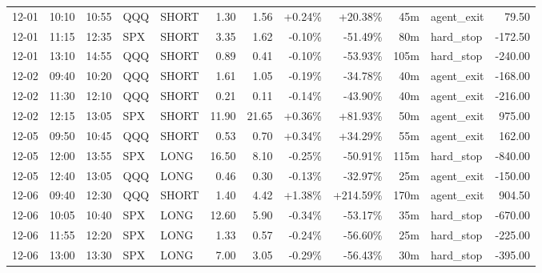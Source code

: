 \documentclass[11pt,a4paper,twoside]{article}
\begin{document}
\begin{center}
\begin{longtable}{>{\color{txtmain}}l l l l l r r r r r >{\color{txtmain}}l r}
12-01 & 10:10 & 10:55 & QQQ & SHORT & 1.30 & 1.56 & \textcolor{wingreen}{+0.24\%} & \textcolor{wingreen}{+20.38\%} & 45m & agent\_exit & \textcolor{wingreen}{79.50} \\
12-01 & 11:15 & 12:35 & SPX & SHORT & 3.35 & 1.62 & \textcolor{lossred}{-0.10\%} & \textcolor{lossred}{-51.49\%} & 80m & hard\_stop & \textcolor{lossred}{-172.50} \\
12-01 & 13:10 & 14:55 & QQQ & SHORT & 0.89 & 0.41 & \textcolor{lossred}{-0.10\%} & \textcolor{lossred}{-53.93\%} & 105m & hard\_stop & \textcolor{lossred}{-240.00} \\
12-02 & 09:40 & 10:20 & QQQ & SHORT & 1.61 & 1.05 & \textcolor{lossred}{-0.19\%} & \textcolor{lossred}{-34.78\%} & 40m & agent\_exit & \textcolor{lossred}{-168.00} \\
12-02 & 11:30 & 12:10 & QQQ & SHORT & 0.21 & 0.11 & \textcolor{lossred}{-0.14\%} & \textcolor{lossred}{-43.90\%} & 40m & agent\_exit & \textcolor{lossred}{-216.00} \\
12-02 & 12:15 & 13:05 & SPX & SHORT & 11.90 & 21.65 & \textcolor{wingreen}{+0.36\%} & \textcolor{wingreen}{+81.93\%} & 50m & agent\_exit & \textcolor{wingreen}{975.00} \\
12-05 & 09:50 & 10:45 & QQQ & SHORT & 0.53 & 0.70 & \textcolor{wingreen}{+0.34\%} & \textcolor{wingreen}{+34.29\%} & 55m & agent\_exit & \textcolor{wingreen}{162.00} \\
12-05 & 12:00 & 13:55 & SPX & LONG & 16.50 & 8.10 & \textcolor{lossred}{-0.25\%} & \textcolor{lossred}{-50.91\%} & 115m & hard\_stop & \textcolor{lossred}{-840.00} \\
12-05 & 12:40 & 13:05 & QQQ & LONG & 0.46 & 0.30 & \textcolor{lossred}{-0.13\%} & \textcolor{lossred}{-32.97\%} & 25m & agent\_exit & \textcolor{lossred}{-150.00} \\
12-06 & 09:40 & 12:30 & QQQ & SHORT & 1.40 & 4.42 & \textcolor{wingreen}{+1.38\%} & \textcolor{wingreen}{+214.59\%} & 170m & agent\_exit & \textcolor{wingreen}{904.50} \\
12-06 & 10:05 & 10:40 & SPX & LONG & 12.60 & 5.90 & \textcolor{lossred}{-0.34\%} & \textcolor{lossred}{-53.17\%} & 35m & hard\_stop & \textcolor{lossred}{-670.00} \\
12-06 & 11:55 & 12:20 & SPX & LONG & 1.33 & 0.57 & \textcolor{lossred}{-0.24\%} & \textcolor{lossred}{-56.60\%} & 25m & hard\_stop & \textcolor{lossred}{-225.00} \\
12-06 & 13:00 & 13:30 & SPX & LONG & 7.00 & 3.05 & \textcolor{lossred}{-0.29\%} & \textcolor{lossred}{-56.43\%} & 30m & hard\_stop & \textcolor{lossred}{-395.00} \\

\end{longtable}
\end{center}
\end{document}
